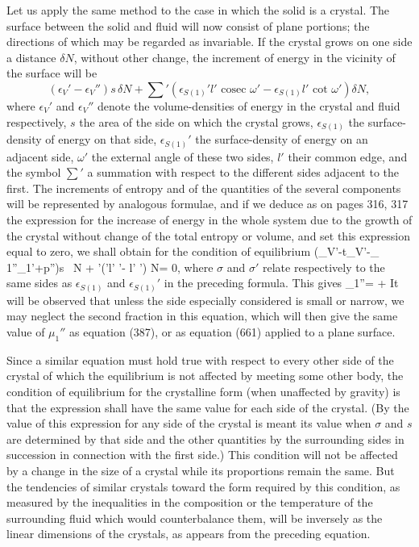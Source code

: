 \documentclass[12pt]{article}
\newcommand{\dd}{\delta}
\begin{document}
Let us apply the same method to the case in which the solid is a crystal. The surface between the solid and fluid will now consist of plane portions; the directions of which may be regarded as invariable. If the crystal grows on one side a distance $\dd N$, without other change, the increment of energy in the vicinity of the surface will be
$$(\epsilon_V'- \epsilon_V'')s \, \dd N + \sum\nolimits'(\epsilon_{S(1)}'l' \text{ cosec } \omega'- \epsilon_{S(1)}l' \text{ cot } \omega') \dd N, $$
where $\epsilon_V'$ and $\epsilon_V''$ denote the volume-densities of energy in the crystal and fluid respectively, $s$ the area of the side on which the crystal grows, $\epsilon_{S(1)}$ the surface-density of energy on that side, $\epsilon_{S(1)}'$ the surface-density of energy on an adjacent side, $\omega'$ the external angle of these two sides, $l'$ their common edge, and the symbol $\sum\nolimits'$ a summation with respect to the different sides adjacent to the first. The increments of entropy and of the quantities of the several components will be represented by analogous formulae, and if we deduce as on pages 316, 317 the expression for the increase of energy in the whole system due to the growth of the crystal without change of the total entropy or volume, and set this expression equal to zero, we shall obtain for the condition of equilibrium
\eqs \left(\epsilon_V'-t\eta_V'-\mu_ 1''\gamma_1'+p''\right)s \, \dd N + \sum\nolimits'(\sigma'l'  \omega'- \sigma l'  \omega') \dd N= 0, \label{664}\eqe
where $\sigma$ and $\sigma'$ relate respectively to the same sides as $\epsilon_{S(1)}$ and $\epsilon_{S(1)}'$ in the preceding formula. This gives
\eqs \mu_1''=  +         \label{665}\eqe
It will be observed that unless the side especially considered is small or narrow, we may neglect the second fraction in this equation, which will then give the same value of $\mu_1''$ as equation (387), or as equation (661) applied to a plane surface.

Since a similar equation must hold true with respect to every other side of the crystal of which the equilibrium is not affected by meeting some other body, the condition of equilibrium for the crystalline form (when unaffected by gravity) is that the expression
\eqs {} \label{666}\eqe
shall have the same value for each side of the crystal. (By the value of this expression for any side of the crystal is meant its value when $\sigma$ and $s$ are determined by that side and the other quantities by the surrounding sides in succession in connection with the first side.) This condition will not be affected by a change in the size of a crystal while its proportions remain the same. But the tendencies of similar crystals toward the form required by this condition, as measured by the inequalities in the composition or the temperature of the surrounding fluid which would counterbalance them, will be inversely as the linear dimensions of the crystals, as appears from the preceding equation.
\end{document}
